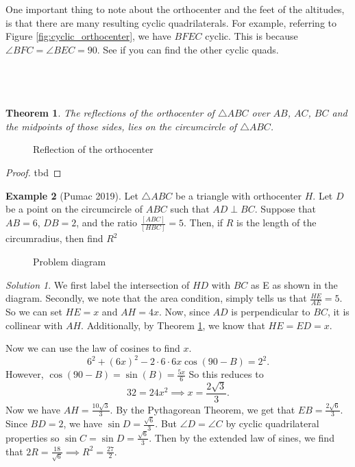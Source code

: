 \documentclass[letterpaper]{article}
\theoremstyle{plain}
\newtheorem{thm}{Theorem}[section]
\theoremstyle{definition}
\newtheorem{example}[thm]{Example}
\theoremstyle{remark}
\newtheorem*{solution}{Solution}
\begin{document}
One important thing to note about the orthocenter and the feet of the altitudes, is that there are many resulting cyclic quadrilaterals.
For example, referring to Figure \ref{fig:cyclic_orthocenter}, we have $BFEC$ cyclic. This is because $\angle BFC = \angle BEC = 90$.
See if you can find the other cyclic quads.\\\\\\\\
\begin{mdframed}
    \begin{thm}\label{reflecting_the_orthocenter}
        The reflections of the orthocenter of $\triangle ABC$ over $AB$, $AC$, $BC$ and the midpoints of those sides, lies on the circumcircle of $\triangle ABC$.
    \end{thm} 
\end{mdframed}


\begin{figure}[!htb]
    \centering
    \scalebox{.75}{}
    \caption{Reflection of the orthocenter}
    \label{fig:reflection_orthocenter}

\end{figure}
\begin{proof}
    tbd
\end{proof}

\begin{example}[Pumac 2019]
    Let $\triangle ABC$ be a triangle with orthocenter $H$. Let $D$ be a point on the circumcircle
    of $ABC$ such that $AD \perp BC$. Suppose that $AB=6$, $DB=2$, and the ratio $\frac{[ABC]}{[HBC]}=5$. Then, if $R$
    is the length of the circumradius, then find $R^2$
\end{example}

\begin{figure}[!htb]
    \centering
    \scalebox{.5}{}
    \caption{Problem diagram}
    \label{fig:pumac_problem}
\end{figure}
\begin{solution}
    We first label the intersection of $HD$ with $BC$ as E as shown in the diagram.
    Secondly, we note that the area condition, simply tells us that $\frac{HE}{AE}=5$. So we can set $HE=x$ and $AH=4x$.
    Now, since $AD$ is perpendicular to $BC$, it is collinear with $AH$. Additionally, by 
    Theorem \ref{reflecting_the_orthocenter}, we know that $HE=ED=x$.

    Now we can use the law of cosines to find $x$. $$6^2+(6x)^2-2\cdot 6\cdot 6x \cos(90-B)=2^2.$$ However, $\cos(90-B)=\sin(B)=\frac{5x}{6}$
    So this reduces to $$32=24x^2 \implies x=\frac{2\sqrt{3}}{3}.$$
    Now we have $AH=\frac{10\sqrt{3}}{3}$. By the Pythagorean Theorem, we get that $EB=\frac{2\sqrt{6}}{3}$. Since $BD=2$, we have $\sin{D}=\frac{\sqrt{6}}{3}$.
    But $\angle D = \angle C$ by cyclic quadrilateral properties so $\sin{C}=\sin{D}=\frac{\sqrt{6}}{3}$. Then by the extended law of sines, we find that 
    $2R = \frac{18}{\sqrt{6}} \implies R^2=\boxed{\frac{27}{2}}$.
\end{solution}
\end{document}
